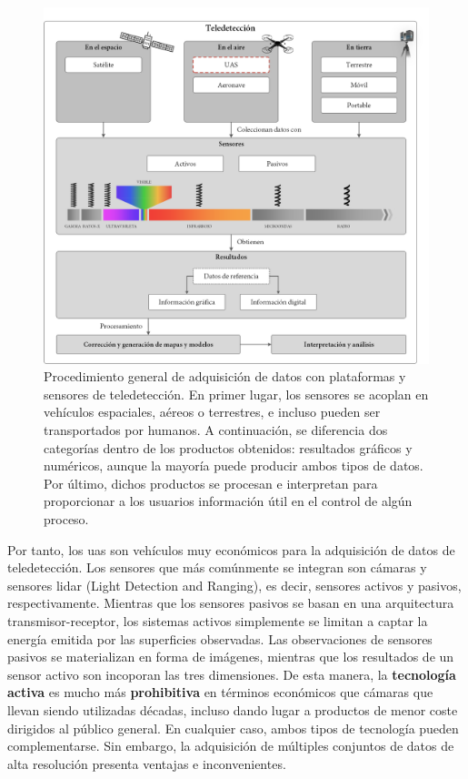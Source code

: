 \begin{figure}[!ht]
	\includegraphics{figs/introduction/introduction_scheme_spanish.png}
	\caption{Procedimiento general de adquisición de datos con plataformas y sensores de teledetección. En primer lugar, los sensores se acoplan en vehículos espaciales, aéreos o terrestres, e incluso pueden ser transportados por humanos. A continuación, se diferencia dos categorías dentro de los productos obtenidos: resultados gráficos y numéricos, aunque la mayoría puede producir ambos tipos de datos. Por último, dichos productos se procesan e interpretan para proporcionar a los usuarios información útil en el control de algún proceso. }
    \label{fig:introduction_scheme_spanish}
\end{figure}

Por tanto, los \acrshort{uas} son vehículos muy económicos para la adquisición de datos de teledetección. Los sensores que más comúnmente se integran son cámaras y sensores \acrshort{lidar} (Light Detection and Ranging), es decir, sensores activos y pasivos, respectivamente. Mientras que los sensores pasivos se basan en una arquitectura transmisor-receptor, los sistemas activos simplemente se limitan a captar la energía emitida por las superficies observadas. Las observaciones de sensores pasivos se materializan en forma de imágenes, mientras que los resultados de un sensor activo son incoporan las tres dimensiones. De esta manera, la \textbf{tecnología activa} es mucho más \textbf{prohibitiva} en términos económicos que cámaras que llevan siendo utilizadas décadas, incluso dando lugar a productos de menor coste dirigidos al público general. En cualquier caso, ambos tipos de tecnología pueden complementarse. Sin embargo, la adquisición de múltiples conjuntos de datos de alta resolución presenta ventajas e inconvenientes. 

